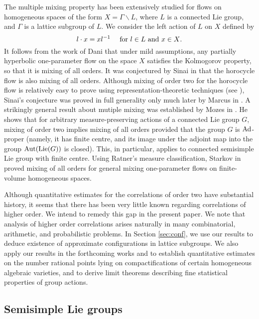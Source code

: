 \documentclass[11pt,reqno,a4paper]{amsart}
\numberwithin{equation}{section}
\theoremstyle{theorem}
\theoremstyle{definition}
\begin{document}
The multiple mixing property has been extensively studied for 
flows on homogeneous spaces of the form 
$X=\Gamma \backslash L$, where $L$ is a connected Lie group,
and $\Gamma$ is a lattice subgroup of $L$. 
We consider the left action of $L$ on $X$ defined by 
\begin{equation}
\label{eq:action}
l\cdot x=xl^{-1}\quad\hbox{ for $l\in L$ and $x\in X$.}
\end{equation}
It follows from the work of Dani \cite{dani1,dani2}
that under mild assumptions, any partially hyperbolic one-parameter flow on the space $X$
satisfies the Kolmogorov property, so that it is mixing of all orders.
It was conjectured by Sinai in \cite{sinai} that the horocycle flow is also mixing of all orders. Although mixing of order two for the horocycle flow is relatively easy to prove using representation-theoretic techniques (see \cite{para}), Sinai's conjecture was proved in full generality  only much later by Marcus in \cite{marcus}.
A strikingly general result about mutiple mixing was established by
Mozes in \cite{mozes}.
He shows that for arbitrary measure-preserving actions of a connected Lie group $G$,
mixing of order two implies mixing of all orders provided that the group $G$ is $\hbox{Ad}$-proper (namely, it has finite centre, and its image under the adjoint
map into the group $\hbox{Aut}(\hbox{Lie}(G))$ is closed). This, in particular,
applies to connected semisimple Lie group with finite centre.
Using Ratner's measure classification, Starkov in \cite{starkov}
proved mixing of all orders for general mixing one-parameter flows on
finite-volume homogeneous spaces.

Although quantitative estimates for the correlations of order two have substantial history,  it seems that there has been very little known regarding correlations of higher order. 
We intend to remedy this gap in the present paper.
We note that analysis of higher order correlations 
arises naturally in many combinatorial, arithmetic, and probabilistic problems.
In Section \ref{sec:conf}, we use our results to deduce existence of approximate configurations in lattice subgroups. We also apply our results 
in the forthcoming works \cite{BEG} and \cite{BG}
to establish quantitative estimates on the number rational points lying on compactifications of certain homogeneous algebraic varieties,
and to derive limit theorems describing fine statistical properties
of group actions.


\subsection{Semisimple Lie groups}\label{s:ss}
\end{document}

